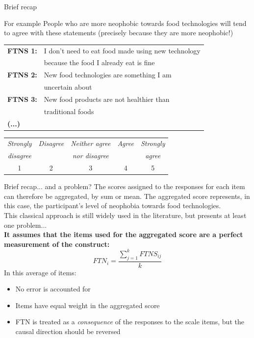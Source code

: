 \documentclass{beamer}
\begin{document}
\begin{frame}{Brief recap}
  \begin{block}{For example}
    People who are more neophobic towards food technologies will tend to agree with these statements (precisely because they are more neophobic!)
  \end{block}
  \vspace{0.3cm}
  \footnotesize
  \begin{tabular}{l l}
    \textbf{FTNS 1:} & I don't need to eat food made using new technology \\
    & because the food I already eat is fine \\
    \textbf{FTNS 2:} & New food technologies are something I am \\
    & uncertain about \\
    \textbf{FTNS 3:} & New food products are not healthier than \\
    & traditional foods \\
    \textbf{(...)}
  \end{tabular}
  \vspace{0.2cm}
  \begin{center}
    \footnotesize
    \begin{tabular}{ccccc}
      \toprule
      \textit{Strongly} & \textit{Disagree} & \textit{Neither agree} & \textit{Agree} & \textit{Strongly} \\
      \textit{disagree} &  & \textit{nor disagree} &  & \textit{agree} \\
      \midrule
      1 & 2 & 3 & 4 & 5 \\
      \bottomrule
    \end{tabular}
  \end{center}
\end{frame}

\begin{frame}{Brief recap... and a problem?}
    The scores assigned to the responses for each item can therefore be aggregated, by sum or mean. The aggregated score represents, in this case, the participant's level of neophobia towards food technologies.\\
    This classical approach is still widely used in the literature, but presents at least one problem... \\
    \pause
    \vspace{1em}
    \textbf{It assumes that the items used for the aggregated score are a perfect measurement of the construct:} \\
    \[
    FTN_i = \frac{\sum_{j=1}^{k} FTNS_{ij}}{k}
    \]
    \small
    In this average of items:
    \begin{itemize}
        \item No error is accounted for
        \item Items have equal weight in the aggregated score
        \item FTN is treated as a \textit{consequence} of the responses to the scale items, but the causal direction should be reversed
    \end{itemize}
\end{frame}
\end{document}
